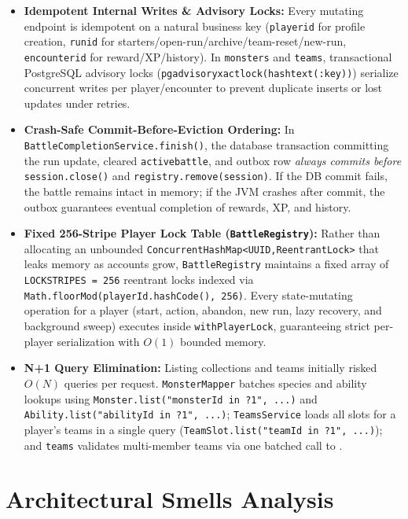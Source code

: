 \documentclass[10.5pt,a4paper]{article}
\DeclareRobustCommand{\code}[1]{\begingroup\def\_{\textunderscore\allowbreak}\texttt{#1}\endgroup}
\begin{document}
\begin{itemize}
  \item \textbf{Idempotent Internal Writes \& Advisory Locks:} Every mutating  endpoint is idempotent on a natural business key (\code{player\_id} for profile creation, \code{run\_id} for starters/open-run/archive/team-reset/new-run, \code{encounter\_id} for reward/XP/history). In \code{monsters} and \code{teams}, transactional PostgreSQL advisory locks (\code{pg\_advisory\_xact\_lock(hashtext(:key))}) serialize concurrent writes per player/encounter to prevent duplicate inserts or lost updates under retries.
  \item \textbf{Crash-Safe Commit-Before-Eviction Ordering:} In \code{BattleCompletionService.finish()}, the database transaction committing the run update, cleared \code{active\_battle\_*}, and outbox row \emph{always commits before} \code{session.close()} and \code{registry.remove(session)}. If the DB commit fails, the battle remains intact in memory; if the JVM crashes after commit, the outbox guarantees eventual completion of rewards, XP, and history.
  \item \textbf{Fixed 256-Stripe Player Lock Table (\code{BattleRegistry}):} Rather than allocating an unbounded \code{ConcurrentHashMap<UUID,\allowbreak ReentrantLock>} that leaks memory as accounts grow, \code{BattleRegistry} maintains a fixed array of \code{LOCK\_STRIPES = 256} reentrant locks indexed via \code{Math.floorMod(\allowbreak playerId.hashCode(), 256)}. Every state-mutating operation for a player (start, action, abandon, new run, lazy recovery, and background sweep) executes inside \code{withPlayerLock}, guaranteeing strict per-player serialization with $O(1)$ bounded memory.
  \item \textbf{N+1 Query Elimination:} Listing collections and teams initially risked $O(N)$ queries per request. \code{MonsterMapper} batches species and ability lookups using \code{Monster.list("monsterId in ?1", ...)} and \code{Ability.list("abilityId in ?1", ...)}; \code{TeamsService} loads all slots for a player's teams in a single query (\code{TeamSlot.list("teamId in ?1", ...)}); and \code{teams} validates multi-member teams via one batched call to .
\end{itemize}

\section{Architectural Smells Analysis}
\label{sec:smells}
\end{document}
